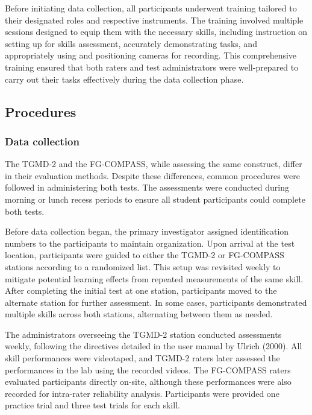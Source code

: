 \documentclass[
  man,
  colorlinks=true,linkcolor=blue,citecolor=blue,urlcolor=blue]{apa7}
\begin{document}
Before initiating data collection, all participants underwent training
tailored to their designated roles and respective instruments. The
training involved multiple sessions designed to equip them with the
necessary skills, including instruction on setting up for skills
assessment, accurately demonstrating tasks, and appropriately using and
positioning cameras for recording. This comprehensive training ensured
that both raters and test administrators were well-prepared to carry out
their tasks effectively during the data collection phase.

\subsection{Procedures}\label{procedures}

\subsubsection{Data collection}\label{data-collection}

The TGMD-2 and the FG-COMPASS, while assessing the same construct,
differ in their evaluation methods. Despite these differences, common
procedures were followed in administering both tests. The assessments
were conducted during morning or lunch recess periods to ensure all
student participants could complete both tests.

Before data collection began, the primary investigator assigned
identification numbers to the participants to maintain organization.
Upon arrival at the test location, participants were guided to either
the TGMD-2 or FG-COMPASS stations according to a randomized list. This
setup was revisited weekly to mitigate potential learning effects from
repeated measurements of the same skill. After completing the initial
test at one station, participants moved to the alternate station for
further assessment. In some cases, participants demonstrated multiple
skills across both stations, alternating between them as needed.

The administrators overseeing the TGMD-2 station conducted assessments
weekly, following the directives detailed in the user manual by Ulrich
(2000). All skill performances were videotaped, and TGMD-2 raters later
assessed the performances in the lab using the recorded videos. The
FG-COMPASS raters evaluated participants directly on-site, although
these performances were also recorded for intra-rater reliability
analysis. Participants were provided one practice trial and three test
trials for each skill.
\end{document}
